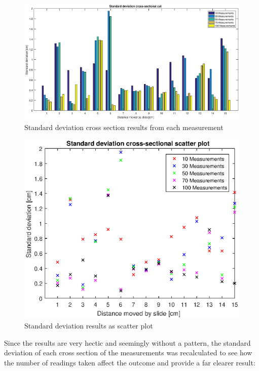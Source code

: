 \documentclass[twoside]{ctuthesis}
\theoremstyle{plain}
\theoremstyle{definition}
\theoremstyle{note}
\begin{document}
\begin{figure}[H]
	\centering
	\includegraphics[width = \textwidth]{CrossSectionStdBars}
	\caption{Standard deviation cross section results from each measurement}
\end{figure}

\begin{figure}[H]
	\centering
	\includegraphics[width = \textwidth]{stdAcrossAllMeasurements}
	\caption{Standard deviation results as scatter plot}
\end{figure}



Since the results are very hectic and seemingly without a pattern, the standard deviation of each cross section of the measurements was recalculated to see how the number of readings taken affect the outcome and provide a far clearer result:
\end{document}
